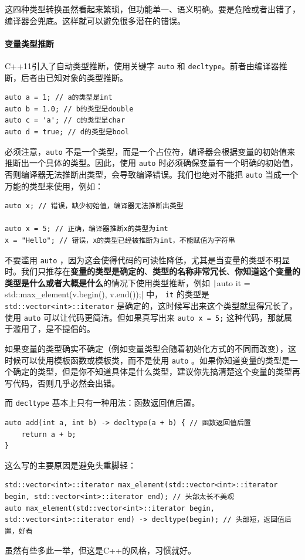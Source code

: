 这四种类型转换虽然看起来繁琐，但功能单一、语义明确。要是危险或者出错了，编译器会兜底。这样就可以避免很多潜在的错误。

\paragraph{变量类型推断}

C++11引入了自动类型推断，使用关键字 \verb|auto| 和 \verb|decltype|。前者由编译器推断，后者由已知对象的类型推断。
\begin{verbatim}
auto a = 1; // a的类型是int
auto b = 1.0; // b的类型是double
auto c = 'a'; // c的类型是char
auto d = true; // d的类型是bool
\end{verbatim}

必须注意，\verb|auto| 不是一个类型，而是一个占位符，编译器会根据变量的初始值来推断出一个具体的类型。因此，使用 \verb|auto| 时必须确保变量有一个明确的初始值，否则编译器无法推断出类型，会导致编译错误。我们也绝对不能把 \verb|auto| 当成一个万能的类型来使用，例如：
\begin{verbatim}
auto x; // 错误，缺少初始值，编译器无法推断出类型

auto x = 5; // 正确，编译器推断x的类型为int
x = "Hello"; // 错误，x的类型已经被推断为int，不能赋值为字符串
\end{verbatim}

不要滥用 \verb|auto| ，因为这会使得代码的可读性降低，尤其是当变量的类型不明显时。我们只推荐在\textbf{变量的类型是确定的}、\textbf{类型的名称非常冗长}、\textbf{你知道这个变量的类型是什么或者大概是什么}的情况下使用类型推断，例如 \texttt|auto it = std::max_element(v.begin(), v.end());| 中， \verb|it| 的类型是 \verb|std::vector<int>::iterator| 是确定的，这时候写出来这个类型就显得冗长了，使用 \verb|auto| 可以让代码更简洁。但如果真写出来 \texttt{auto x = 5;} 这种代码，那就属于滥用了，是不提倡的。

如果变量的类型确实不确定（例如变量类型会随着初始化方式的不同而改变），这时候可以使用模板函数或模板类，而不是使用 \verb|auto| 。如果你知道变量的类型是一个确定的类型，但是你不知道具体是什么类型，建议你先搞清楚这个变量的类型再写代码，否则几乎必然会出错。

而 \verb|decltype| 基本上只有一种用法：函数返回值后置。
\begin{verbatim}
auto add(int a, int b) -> decltype(a + b) { // 函数返回值后置
    return a + b;
}
\end{verbatim}

这么写的主要原因是避免头重脚轻：
\begin{verbatim}
std::vector<int>::iterator max_element(std::vector<int>::iterator begin, std::vector<int>::iterator end); // 头部太长不美观
auto max_element(std::vector<int>::iterator begin, std::vector<int>::iterator end) -> decltype(begin); // 头部短，返回值后置，好看
\end{verbatim}
虽然有些多此一举，但这是C++的风格，习惯就好。

